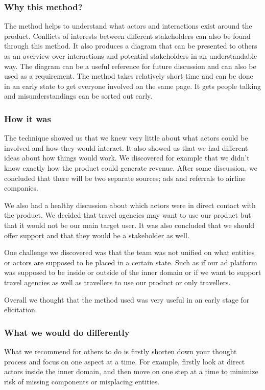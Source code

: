 \subsubsection{Why this method?}
The method helps to understand what actors and interactions exist around the product. Conflicts of interests between different stakeholders can also be found through this method. It also produces a diagram that can be presented to others as an overview over interactions and potential stakeholders in an understandable way. The diagram can be a useful reference for future discussion and can also be used as a requirement. The method takes relatively short time and can be done in an early state to get everyone involved on the same page. It gets people talking and misunderstandings can be sorted out early.
\subsubsection{How it was}
The technique showed us that we knew very little about what actors could be involved and how they would interact. It also showed us that we had different ideas about how things would work. We discovered for example that we didn’t know exactly how the product could generate revenue. After some discussion, we concluded that there will be two separate sources; ads and referrals to airline companies. 

We also had a healthy discussion about which actors were in direct contact with the product. We decided that travel agencies may want to use our product but that it would not be our main target user. It was also concluded that we should offer support and that they would be a stakeholder as well. 

One challenge we discovered was that the team was not unified on what entities or actors are supposed to be placed in a certain state. Such as if our ad platform was supposed to be inside or outside of the inner domain or if we want to support travel agencies as well as travellers to use our product or only travellers.

Overall we thought that the method used was very useful in an early stage for elicitation.
\subsubsection{What we would do differently}
What we recommend for others to do is firstly shorten down your thought process and focus on one aspect at a time. For example, firstly look at direct actors inside the inner domain, and then move on one step at a time to minimize risk of missing components or misplacing entities.

